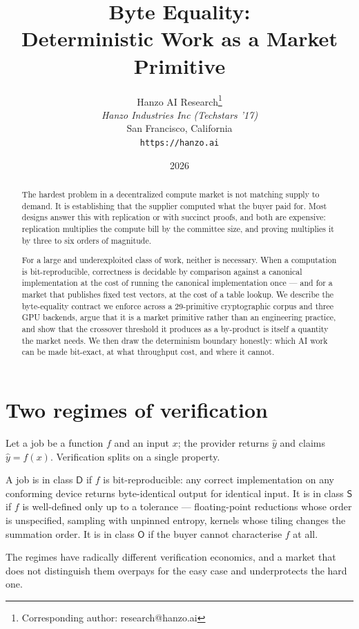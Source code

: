 \documentclass[11pt,a4paper]{article}
\title{Byte Equality:\\Deterministic Work as a Market Primitive}
\author{
Hanzo AI Research\thanks{Corresponding author: research@hanzo.ai} \\
\textit{Hanzo Industries Inc (Techstars '17)} \\
San Francisco, California \\
\texttt{https://hanzo.ai}
}
\date{2026}
\begin{document}
\hanzocoverpage

\begin{abstract}
The hardest problem in a decentralized compute market is not matching supply to
demand. It is establishing that the supplier computed what the buyer paid for.
Most designs answer this with replication or with succinct proofs, and both are
expensive: replication multiplies the compute bill by the committee size, and
proving multiplies it by three to six orders of magnitude.

For a large and underexploited class of work, neither is necessary. When a
computation is bit-reproducible, correctness is decidable by comparison against
a canonical implementation at the cost of running the canonical implementation
once --- and for a market that publishes fixed test vectors, at the cost of a
table lookup. We describe the byte-equality contract we enforce across a
29-primitive cryptographic corpus and three GPU backends, argue that it is a
market primitive rather than an engineering practice, and show that the
crossover threshold it produces as a by-product is itself a quantity the market
needs. We then draw the determinism boundary honestly: which AI work can be made
bit-exact, at what throughput cost, and where it cannot.
\end{abstract}

\tableofcontents
\newpage

\section{Two regimes of verification}

Let a job be a function $f$ and an input $x$; the provider returns $\hat{y}$ and
claims $\hat{y} = f(x)$. Verification splits on a single property.

\begin{definition}
A job is in class $\mathsf{D}$ if $f$ is bit-reproducible: any correct
implementation on any conforming device returns byte-identical output for
identical input. It is in class $\mathsf{S}$ if $f$ is well-defined only up to a
tolerance --- floating-point reductions whose order is unspecified, sampling with
unpinned entropy, kernels whose tiling changes the summation order. It is in
class $\mathsf{O}$ if the buyer cannot characterise $f$ at all.
\end{definition}

The regimes have radically different verification economics, and a market that
does not distinguish them overpays for the easy case and underprotects the hard
one.
\end{document}
